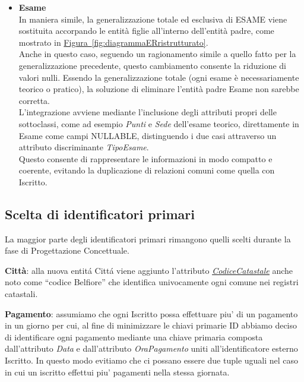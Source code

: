 \documentclass[10pt,twoside]{article}
\begin{document}
{{\begin{itemize}
            Sarebbe stato possibile mantenere le entità figlie,
            spostando in esse gli attributi specifici, ma ciò avrebbe comportato la duplicazione 
            delle relazioni comuni come Prenotazione e Recensione verso entrambe
            le sottoclassi.
            \item \textbf{Esame} \\In maniera simile, la generalizzazione totale ed esclusiva di ESAME viene sostituita 
            accorpando le entità figlie all’interno dell'entità padre, come mostrato in \hyperref[fig:diagrammaERristrutturato]{Figura~\ref*{fig:diagrammaERristrutturato}}. \\ 
            Anche in questo caso, seguendo un ragionamento simile a quello fatto per la 
            generalizzazione precedente, questo cambiamento consente la riduzione di valori nulli.
            Essendo la generalizzazione totale (ogni esame è necessariamente teorico o pratico), 
            la soluzione di eliminare l’entità padre Esame non sarebbe corretta. \\
            L'integrazione avviene mediante l'inclusione degli attributi propri delle sottoclassi,
            come ad esempio \textit{Punti} e \textit{Sede} dell'esame teorico, direttamente in Esame come campi 
            NULLABLE, distinguendo i due casi attraverso un attributo discriminante \textit{TipoEsame}. \\
            Questo consente di rappresentare le informazioni in modo compatto e coerente, 
            evitando la duplicazione di relazioni comuni come quella con Iscritto.
        \end{itemize}
    }

    \subsection{Scelta di identificatori primari}{
        La maggior parte degli identificatori primari rimangono quelli scelti durante la fase di Progettazione Concettuale.
        
        \textbf{Città}: alla nuova entitá Cittá viene aggiunto l’attributo \underline{\href{https://www.agenziaentrate.gov.it/portale/documents/20143/448384/Tabella+codici+catastali+comuni_T4_codicicatastali_comuni_24_05_2019.pdf/d4fa70bd-f4bd-caba-24cb-5cc3611237c0}{\textit{CodiceCatastale}}} anche noto come “codice
        Belfiore” che identifica univocamente ogni comune nei registri catastali.
        
        \textbf{Pagamento}: assumiamo che ogni Iscritto possa effettuare piu' di un pagamento in un giorno per cui, al fine di minimizzare le chiavi primarie ID abbiamo deciso di identificare ogni pagamento mediante una chiave primaria composta dall'attributo \textit{Data} e dall'attributo \textit{OraPagamento} uniti all'identificatore esterno Iscritto. In questo modo evitiamo che ci possano essere due tuple uguali nel caso in cui un iscritto effettui piu' pagamenti nella stessa giornata.\\
    }

}
\end{document}

